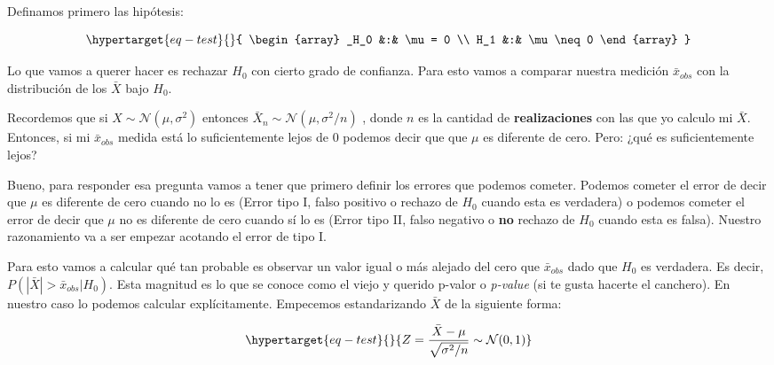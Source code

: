 \documentclass[
  letterpaper,
  DIV=11,
  numbers=noendperiod,
  oneside]{scrreprt}
\begin{document}
Definamos primero las hipótesis:

\begin{equation}\protect\hypertarget{eq-test}{}{
\begin{array}
_H_0 &:& \mu = 0 \\
H_1 &:& \mu \neq 0
\end{array}
}\label{eq-test}\end{equation}

Lo que vamos a querer hacer es rechazar \(H_0\) con cierto grado de
confianza. Para esto vamos a comparar nuestra medición \(\bar{x}_{obs}\)
con la distribución de los \(\bar{X}\) bajo \(H_0\).

Recordemos que si \(X \sim \mathcal{N}(\mu, \sigma^2)\) entonces
\(\bar{X}_n \sim \mathcal{N}(\mu, \sigma^2/n)\) ,
donde \(n\) es la cantidad de \textbf{realizaciones} con las que yo
calculo mi \(\bar{X}\). Entonces, si mi \(\bar{x}_{obs}\) medida está lo
suficientemente lejos de \(0\) podemos decir que que \(\mu\) es
diferente de cero. Pero: ¿qué es suficientemente lejos?

Bueno, para responder esa pregunta vamos a tener que primero definir los
errores que podemos cometer. Podemos cometer el error de decir que
\(\mu\) es diferente de cero cuando no lo es (Error tipo I, falso
positivo o rechazo de \(H_0\) cuando esta es verdadera) o podemos
cometer el error de decir que \(\mu\) no es diferente de cero cuando sí
lo es (Error tipo II, falso negativo o \textbf{no} rechazo de \(H_0\)
cuando esta es falsa). Nuestro razonamiento va a ser empezar acotando el
error de tipo I.

Para esto vamos a calcular qué tan probable es observar un valor igual o
más alejado del cero que \(\bar{x}_{obs}\) dado que \(H_0\) es
verdadera. Es decir, \(P(|\bar{X}|>\bar{x}_{obs}|H_0)\). Esta magnitud
es lo que se conoce como el viejo y querido p-valor o \emph{p-value} (si
te gusta hacerte el canchero). En nuestro caso lo podemos calcular
explícitamente. Empecemos estandarizando \(\bar{X}\) de la siguiente
forma:

\begin{equation}\protect\hypertarget{eq-test}{}{
Z = \frac{\bar{X} - \mu}{\sqrt{\sigma^2/n}} \sim \mathcal{N}(0,1)
}\label{eq-test}\end{equation}
\end{document}
